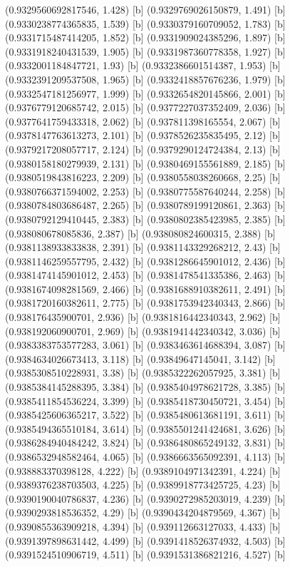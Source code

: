 {{{(0.9329560692817546, 1.428) [b] 
(0.9329769026150879, 1.491) [b] 
(0.9330238774365835, 1.539) [b] 
(0.9330379160709052, 1.783) [b] 
(0.9331715487414205, 1.852) [b] 
(0.9331909024385296, 1.897) [b] 
(0.9331918240431539, 1.905) [b] 
(0.9331987360778358, 1.927) [b] 
(0.9332001184847721, 1.93) [b] 
(0.9332386601514387, 1.953) [b] 
(0.9332391209537508, 1.965) [b] 
(0.9332418857676236, 1.979) [b] 
(0.9332547181256977, 1.999) [b] 
(0.9332654820145866, 2.001) [b] 
(0.9376779120685742, 2.015) [b] 
(0.9377227037352409, 2.036) [b] 
(0.9377641759433318, 2.062) [b] 
(0.937811398165554, 2.067) [b] 
(0.9378147763613273, 2.101) [b] 
(0.9378526235835495, 2.12) [b] 
(0.9379217208057717, 2.124) [b] 
(0.9379290124724384, 2.13) [b] 
(0.9380158180279939, 2.131) [b] 
(0.9380469155561889, 2.185) [b] 
(0.9380519843816223, 2.209) [b] 
(0.9380558038260668, 2.25) [b] 
(0.9380766371594002, 2.253) [b] 
(0.9380775587640244, 2.258) [b] 
(0.9380784803686487, 2.265) [b] 
(0.9380789199120861, 2.363) [b] 
(0.9380792129410445, 2.383) [b] 
(0.9380802385423985, 2.385) [b] 
(0.938080678085836, 2.387) [b] 
(0.938080824600315, 2.388) [b] 
(0.9381138933833838, 2.391) [b] 
(0.9381143329268212, 2.43) [b] 
(0.9381146259557795, 2.432) [b] 
(0.9381286645901012, 2.436) [b] 
(0.9381474145901012, 2.453) [b] 
(0.9381478541335386, 2.463) [b] 
(0.9381674098281569, 2.466) [b] 
(0.9381688910382611, 2.491) [b] 
(0.9381720160382611, 2.775) [b] 
(0.9381753942340343, 2.866) [b] 
(0.938176435900701, 2.936) [b] 
(0.9381816442340343, 2.962) [b] 
(0.938192060900701, 2.969) [b] 
(0.9381941442340342, 3.036) [b] 
(0.9383383753577283, 3.061) [b] 
(0.9383463614688394, 3.087) [b] 
(0.9384634026673413, 3.118) [b] 
(0.93849647145041, 3.142) [b] 
(0.9385308510228931, 3.38) [b] 
(0.9385322262057925, 3.381) [b] 
(0.9385384145288395, 3.384) [b] 
(0.9385404978621728, 3.385) [b] 
(0.9385411854536224, 3.399) [b] 
(0.9385418730450721, 3.454) [b] 
(0.9385425606365217, 3.522) [b] 
(0.9385480613681191, 3.611) [b] 
(0.9385494365510184, 3.614) [b] 
(0.9385501241424681, 3.626) [b] 
(0.9386284940484242, 3.824) [b] 
(0.9386480865249132, 3.831) [b] 
(0.9386532948582464, 4.065) [b] 
(0.9386663565092391, 4.113) [b] 
(0.938883370398128, 4.222) [b] 
(0.9389104971342391, 4.224) [b] 
(0.9389376238703503, 4.225) [b] 
(0.9389918773425725, 4.23) [b] 
(0.9390190040786837, 4.236) [b] 
(0.9390272985203019, 4.239) [b] 
(0.9390293818536352, 4.29) [b] 
(0.9390434204879569, 4.367) [b] 
(0.9390855363909218, 4.394) [b] 
(0.939112663127033, 4.433) [b] 
(0.9391397898631442, 4.499) [b] 
(0.9391418526374932, 4.503) [b] 
(0.9391524510906719, 4.511) [b] 
(0.9391531386821216, 4.527) [b] 
}}}
